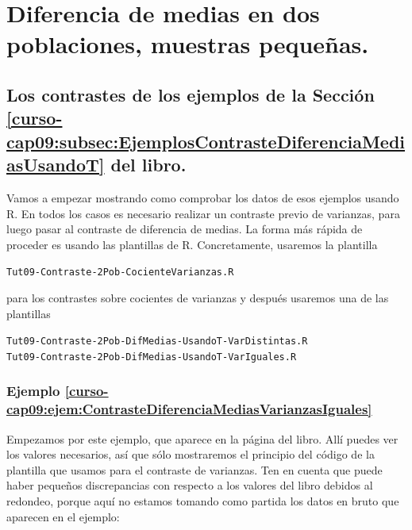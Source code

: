 \documentclass[10pt,a4paper]{article}\usepackage[]{graphicx}\usepackage[]{color}
\newcounter {cont01}
\begin{document}
\section{Diferencia de medias en dos poblaciones, muestras pequeñas.}
\label{tut09:sec:DiferenciaMedias2PoblacionesPequennas}


\subsection{Los contrastes de los ejemplos de la Sección \ref{curso-cap09:subsec:EjemplosContrasteDiferenciaMediasUsandoT} del libro.}


Vamos a empezar mostrando como comprobar los datos de esos ejemplos usando R. En todos los casos es necesario realizar un contraste previo de varianzas, para luego pasar al contraste de diferencia de medias. La forma más rápida de proceder es usando las plantillas de R. Concretamente, usaremos la plantilla
\begin{center}
  {\tt Tut09-Contraste-2Pob-CocienteVarianzas.R}
\end{center}
para los contrastes sobre cocientes de varianzas y después usaremos una de las plantillas
\begin{center}
  {\tt Tut09-Contraste-2Pob-DifMedias-UsandoT-VarDistintas.R}\\
  {\tt Tut09-Contraste-2Pob-DifMedias-UsandoT-VarIguales.R}
\end{center}

\subsubsection*{Ejemplo \ref{curso-cap09:ejem:ContrasteDiferenciaMediasVarianzasIguales}}
Empezamos por este ejemplo, que aparece en la página \pageref{curso-cap09:ejem:ContrasteDiferenciaMediasVarianzasIguales} del libro. Allí puedes ver los valores necesarios, así que sólo mostraremos el principio del código de la plantilla que usamos para el contraste de varianzas. Ten en cuenta que puede haber pequeños discrepancias con respecto a los valores del libro debidos al redondeo, porque aquí no estamos tomando como partida los datos en bruto que aparecen en el ejemplo:
\end{document}
